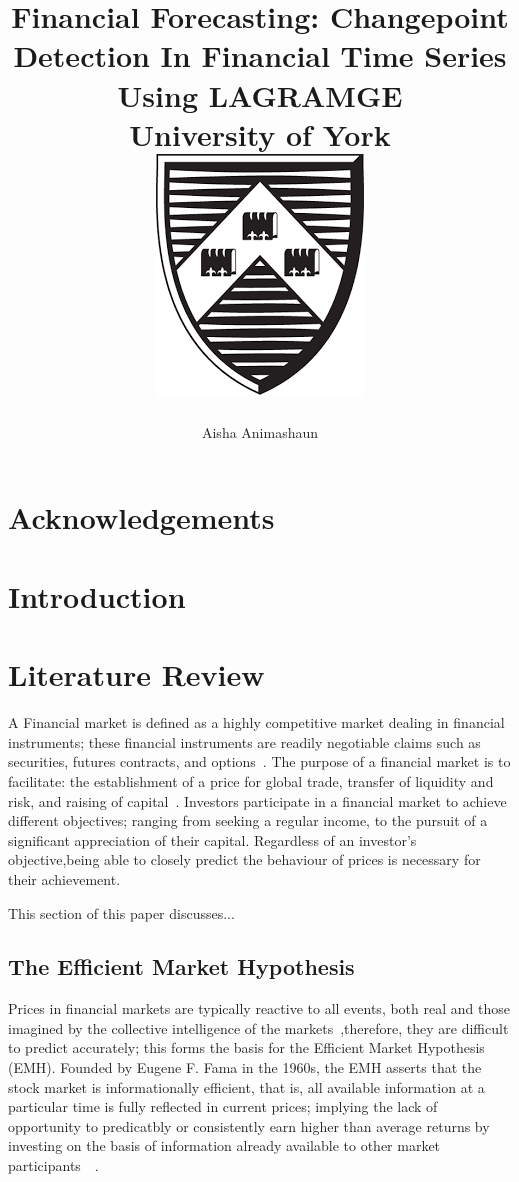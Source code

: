 \documentclass[13pt]{report}
\title{
	{Financial Forecasting: Changepoint Detection In Financial Time Series Using LAGRAMGE}\\
	{University of York}\\
	{\includegraphics[scale=0.5]{uoycrest.jpg}}
	}
\author{Aisha Animashaun}
\begin{document}
\maketitle
{}
\tableofcontents
\listoffigures
\listoftables
\chapter*{Acknowledgements}
\begin{abstract}
\end{abstract}
\chapter{Introduction}
\chapter{Literature Review}
A Financial market is defined as a highly competitive market dealing in financial instruments; these financial instruments are readily negotiable claims such as securities, futures contracts, and options~\cite{houthakker1996economics}. The purpose of a financial market is to facilitate: the establishment of a price for global trade, transfer of liquidity and risk, and raising of capital~\cite{investopediafinancialmarketsdef}. Investors participate in a financial market to achieve different objectives; ranging from seeking a regular income, to the pursuit of a significant appreciation of their capital. Regardless of an investor's objective,being able to closely predict the behaviour of prices is necessary for their achievement.\par

This section of this paper discusses...

\section{The Efficient Market Hypothesis}
Prices in financial markets are typically reactive to all events, both real and those imagined by the collective intelligence of the markets~\cite{cootner1964random},therefore, they are difficult to predict accurately; this forms the basis for the Efficient Market Hypothesis (EMH). Founded by Eugene F. Fama in the 1960s, the EMH asserts that the stock market is informationally efficient, that is, all available information at a particular time is fully reflected in current prices; implying the lack of opportunity to predicatbly or consistently earn higher than average returns by investing on the basis of information already available to other market participants~\cite{houthakker1996economics}~\cite{clarke2001efficient}. \par
\end{document}
